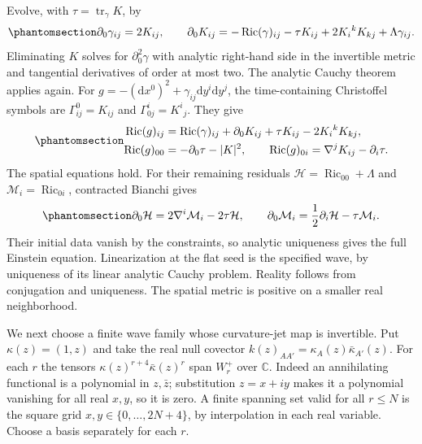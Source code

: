 \documentclass[
  english,
  11pt,
  reqno]{amsart}
\begin{document}
Evolve, with \(\tau=\operatorname{tr}_\gamma K\), by
\begin{equation}\protect\phantomsection\label{eq:gg-finite-gaussian-evolution}{
 \partial_0\gamma_{ij}=2K_{ij},\qquad
 \partial_0K_{ij}=-\operatorname{Ric}(\gamma)_{ij}
                  -\tau K_{ij}+2K_i{}^kK_{kj}
                  +\Lambda\gamma_{ij}.
}\end{equation} Eliminating \(K\) solves for \(\partial_0^2\gamma\) with
analytic right-hand side in the invertible metric and tangential
derivatives of order at most two. The analytic Cauchy theorem applies
again. For \(g=-(\mathrm dx^0)^2+\gamma_{ij}\mathrm dy^i\mathrm dy^j\),
the time-containing Christoffel symbols are \(\Gamma^0_{ij}=K_{ij}\) and
\(\Gamma^i_{0j}=K^i{}_j\). They give
\begin{equation}\protect\phantomsection\label{eq:gg-finite-gaussian-ricci}{
 \begin{aligned}
 \operatorname{Ric}(g)_{ij}
    &=\operatorname{Ric}(\gamma)_{ij}+\partial_0K_{ij}
                             +\tau K_{ij}-2K_i{}^kK_{kj},\\
 \operatorname{Ric}(g)_{00}&=-\partial_0\tau-|K|^2,\qquad
 \operatorname{Ric}(g)_{0i}=\nabla^jK_{ij}-\partial_i\tau .
 \end{aligned}
}\end{equation} The spatial equations hold. For their remaining
residuals \(\mathcal H=\operatorname{Ric}_{00}+\Lambda\) and
\(\mathcal M_i=\operatorname{Ric}_{0i}\), contracted Bianchi gives
\begin{equation}\protect\phantomsection\label{eq:gg-finite-constraint-propagation}{
 \partial_0\mathcal H
       =2\nabla^i\mathcal M_i-2\tau\mathcal H,\qquad
 \partial_0\mathcal M_i=\frac12\partial_i\mathcal H-\tau\mathcal M_i .
}\end{equation} Their initial data vanish by the constraints, so
analytic uniqueness gives the full Einstein equation. Linearization at
the flat seed is the specified wave, by uniqueness of its linear
analytic Cauchy problem. Reality follows from conjugation and
uniqueness. The spatial metric is positive on a smaller real
neighborhood.

We next choose a finite wave family whose curvature-jet map is
invertible. Put \(\kappa(z)=(1,z)\) and take the real null covector
\(k(z)_{AA'}=\kappa_A(z)\bar\kappa_{A'}(z)\). For each \(r\) the tensors
\(\kappa(z)^{r+4}\bar\kappa(z)^r\) span \(W_r^+\) over \(\mathbb C\).
Indeed an annihilating functional is a polynomial in \(z,\bar z\);
substitution \(z=x+iy\) makes it a polynomial vanishing for all real
\(x,y\), so it is zero. A finite spanning set valid for all \(r\le N\)
is the square grid \(x,y\in\{0,\ldots,2N+4\}\), by interpolation in each
real variable. Choose a basis separately for each \(r\).
\end{document}
